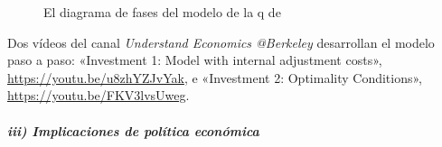 \documentclass[11pt]{article}
\begin{document}
\begin{figure}[H]
\centering
\caption{El diagrama de fases del modelo de la q de }\label{fig:q-fases}
\end{figure}

\begin{anotaciones}
Dos vídeos del canal \emph{Understand Economics @Berkeley} desarrollan el modelo paso a paso: «Investment 1: Model with internal adjustment costs», \url{https://youtu.be/u8zhYZJvYak}, e «Investment 2: Optimality Conditions», \url{https://youtu.be/FKV3lvsUweg}.
\end{anotaciones}

\subparagraph{iii) Implicaciones de política económica}
\end{document}
